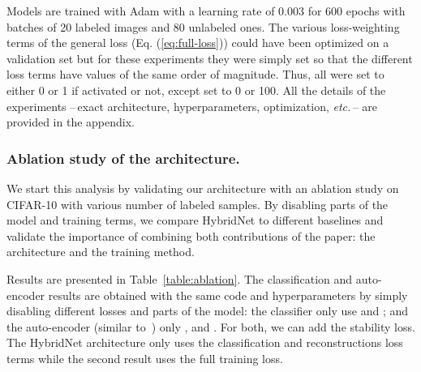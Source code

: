 \documentclass[runningheads]{llncs}
\begin{document}
Models are trained with Adam with a learning rate of 0.003 for 600 epochs with batches of 20 labeled images and 80 unlabeled ones. The various loss-weighting terms  of the general loss (Eq. (\ref{eq:full-loss})) could have been optimized on a validation set but for these experiments they were simply set so that the different loss terms have values of the same order of magnitude.
Thus, all  were set to either 0 or 1 if activated or not, except  set to 0 or 100.
All the details of the experiments --\,exact architecture, hyperparameters, optimization, \textit{etc.}\,-- are provided in the appendix.


\subsubsection{Ablation study of the architecture.}

We start this analysis by validating our architecture with an ablation study on CIFAR-10 with various number of labeled samples. By disabling parts of the model and training terms, we compare HybridNet to different baselines and validate the importance of combining both contributions of the paper: the architecture and the training method.

Results are presented in Table~\ref{table:ablation}. The classification and auto-encoder results are obtained with the same code and hyperparameters by simply disabling different losses and parts of the model: the classifier only use  and ; and the auto-encoder (similar to~\cite{Zhao2016a}) only ,  and . For both, we can add the stability loss. The HybridNet architecture only uses the classification and reconstructions loss terms while the second result uses the full training loss.
\end{document}
